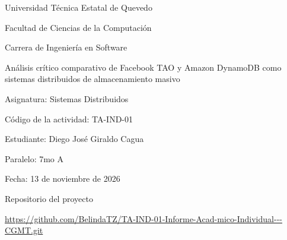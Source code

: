 \documentclass[12pt,a4paper]{article}
\begin{document}
\begin{titlepage}
\centering
\thispagestyle{empty}

\vspace*{0.8cm}

{\Large Universidad Técnica Estatal de Quevedo\par}

\vspace{0.4cm}

{\large Facultad de Ciencias de la Computación\par}

\vspace{0.3cm}

{\large Carrera de Ingeniería en Software\par}

\vspace{1.6cm}

{\Large
Análisis crítico comparativo de Facebook TAO
y Amazon DynamoDB como sistemas distribuidos
de almacenamiento masivo
\par}

\vspace{1.5cm}

{\large
Asignatura: Sistemas Distribuidos\par
}

\vspace{0.4cm}

{\large
Código de la actividad: TA-IND-01\par
}

\vspace{0.8cm}

{\large
Estudiante: Diego José Giraldo Cagua\par
}

\vspace{0.4cm}

{\large
Paralelo: 7mo A\par
}

\vspace{0.4cm}

{\large
Fecha: 13 de noviembre de 2026\par
}

\vfill

{\normalsize Repositorio del proyecto\par}

\vspace{0.3cm}

\begin{minipage}{0.95\textwidth}
\centering
\small
\url{https://github.com/BelindaTZ/TA-IND-01-Informe-Acad-mico-Individual---CGMT.git}
\par
\end{minipage}

\vspace*{0.8cm}

\end{titlepage}
\end{document}
